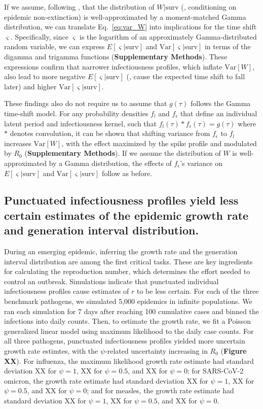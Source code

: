 If we assume, following \citet{morris_computation_2024}, that the distribution of $W | \text{surv}$ (\ie, conditioning on epidemic non-extinction) is well-approximated by a moment-matched Gamma distribution, we can translate Eq.~\ref{eq:var_W} into implications for the time shift $\varsigma$. Specifically, since $\varsigma$ is the logarithm of an approximately Gamma-distributed random variable, we can express $E[\varsigma | \text{surv}]$ and $\text{Var}[\varsigma | \text{surv}]$ in terms of the digamma and trigamma functions ({\bf Supplementary Methods}). These expressions confirm that narrower infectiousness profiles, which inflate $\text{Var}[W]$, also lead to more negative $E[\varsigma | \text{surv}]$ (\ie, cause the expected time shift to fall later) and higher $\text{Var}[\varsigma | \text{surv}]$.

These findings also do not require us to assume that $g(\tau)$ follows the Gamma time-shift model. For any probability densities $f_l$ and $f_\epsilon$ that define an individual latent period and infectiousness kernel, such that $f_l(\tau) * f_\epsilon(\tau) = g(\tau)$ where $*$ denotes convolution, it can be shown that shifting variance from $f_\epsilon$ to $f_l$ increases $\text{Var}[W]$, with the effect maximized by the spike profile and modulated by $R_0$ ({\bf Supplementary Methods}). If we assume the distribution of $W$ is well-approximated by a Gamma distribution, the effects of $f_\epsilon$'s variance on $E[\varsigma | \text{surv}]$ and $\text{Var}[\varsigma | \text{surv}]$ follow as before. 

\subsection{Punctuated infectiousness profiles yield less certain estimates of the epidemic growth rate and generation interval distribution.} 

During an emerging epidemic, inferring the growth rate and the generation interval distribution are among the first critical tasks. These are key ingredients for calculating the reproduction number, which determines the effort needed to control an outbreak. Simulations indicate that punctuated individual infectiousness profiles cause estimates of $r$ to be less certain. For each of the three benchmark pathogens, we simulated 5,000 epidemics in infinite populations. We ran each simulation for 7 days after reaching 100 cumulative cases and binned the infections into daily counts. Then, to estimate the growth rate, we fit a Poisson generalized linear model using maximum likelihood to the daily case counts. For all three pathogens, punctuated infectiousness profiles yielded more uncertain growth rate estimtes, with the $\psi$-related uncertainty increasing in $R_0$ ({\bf Figure XX}). For influenza, the maximum likelihood growth rate estimate had standard deviation XX for $\psi = 1$, XX for $\psi = 0.5$, and XX for $\psi = 0$; for SARS-CoV-2 omicron, the growth rate estimate had standard deviation  XX for $\psi = 1$, XX for $\psi = 0.5$, and XX for $\psi = 0$; and for measles, the growth rate estimate had standard deviation  XX for $\psi = 1$, XX for $\psi = 0.5$, and XX for $\psi = 0$. 

